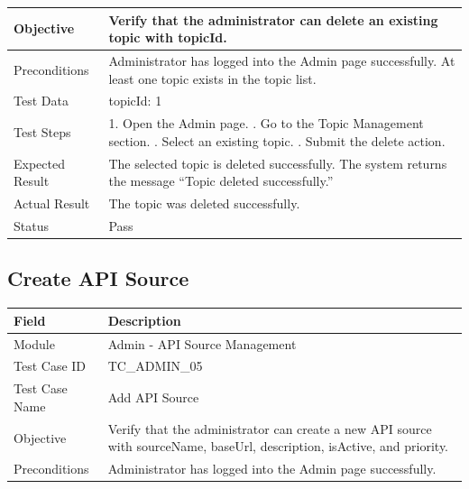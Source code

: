 \documentclass[12pt,a4paper]{article}
\begin{document}
{{\begin{longtable}{|p{4cm}|p{10cm}|}
	Objective &
	Verify that the administrator can delete an existing topic with topicId. \\ \hline
	
	Preconditions &
	Administrator has logged into the Admin page successfully. \newline
	At least one topic exists in the topic list.
	\\ \hline
	
	Test Data &
	topicId: 1
	\\ \hline
	
	Test Steps &
	1. Open the Admin page. \newline
	2. Go to the Topic Management section. \newline
	3. Select an existing topic. \newline
	4. Submit the delete action.
	\\ \hline
	
	Expected Result &
	The selected topic is deleted successfully. The system returns the message ``Topic deleted successfully.'' \\ \hline
	
	Actual Result &
	The topic was deleted successfully. \\ \hline
	
	Status & Pass \\ \hline
	
\end{longtable}
\subsection{Create API Source}
\begin{longtable}{|p{4cm}|p{10cm}|}
	\hline
	\textbf{Field} & \textbf{Description} \\ \hline
	
	Module & Admin - API Source Management \\ \hline
	
	Test Case ID & TC\_ADMIN\_05 \\ \hline
	
	Test Case Name & Add API Source \\ \hline
	
	Objective &
	Verify that the administrator can create a new API source with sourceName, baseUrl, description, isActive, and priority. \\ \hline
	
	Preconditions &
	Administrator has logged into the Admin page successfully.
	\\ \hline
	

\end{longtable}}}
\end{document}
